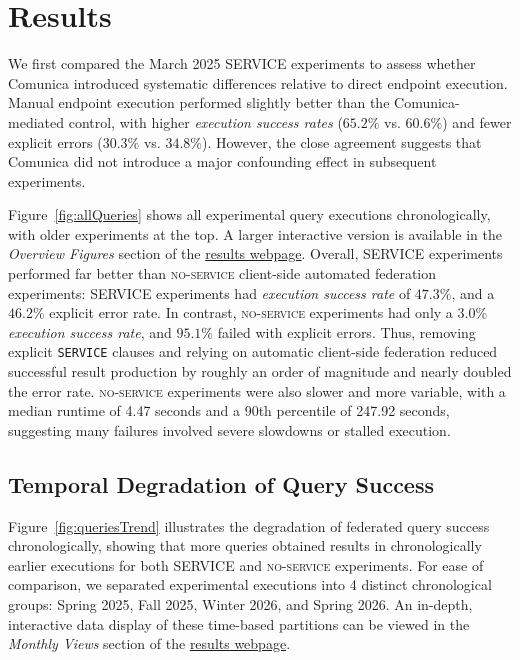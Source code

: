 \documentclass[runningheads]{llncs}
\begin{document}
\section{Results}\label{sec5}
We first compared the March 2025 \textsc{SERVICE} experiments to assess whether Comunica introduced systematic differences relative to direct endpoint execution.
Manual endpoint execution performed slightly better than the Comunica-mediated control, with higher \emph{execution success rates} (\(65.2\%\) vs. \(60.6\%\)) and fewer explicit errors (\(30.3\%\) vs. \(34.8\%\)).
However, the close agreement suggests that Comunica did not introduce a major confounding effect in subsequent experiments.


Figure~\ref{fig:allQueries} shows all experimental query executions chronologically, with older experiments at the top.
A larger interactive version is available in the \textit{Overview Figures} section of the \href{https://ecrum19.github.io/fed-survey-results/}{results webpage}.
Overall, \textsc{SERVICE} experiments performed far better than \textsc{no-service} client-side automated federation experiments: \textsc{SERVICE} experiments had \emph{execution success rate} of \(47.3\%\), and a \(46.2\%\) explicit error rate.
In contrast, \textsc{no-service} experiments had only a \(3.0\%\) \emph{execution success rate}, and \(95.1\%\) failed with explicit errors.
Thus, removing explicit \texttt{SERVICE} clauses and relying on automatic client-side federation reduced successful result production by roughly an order of magnitude and nearly doubled the error rate.
\textsc{no-service} experiments were also slower and more variable, with a median runtime of 4.47 seconds and a 90th percentile of 247.92 seconds, suggesting many failures involved severe slowdowns or stalled execution.


\subsection{Temporal Degradation of Query Success}\label{sec5.1}


Figure~\ref{fig:queriesTrend} illustrates the degradation of federated query success chronologically, showing that more queries obtained results in chronologically earlier executions for both \textsc{SERVICE} and \textsc{no-service} experiments.
For ease of comparison, we separated experimental executions into 4 distinct chronological groups: Spring 2025, Fall 2025, Winter 2026, and Spring 2026.
An in-depth, interactive data display of these time-based partitions can be viewed in the \textit{Monthly Views} section of the \href{https://ecrum19.github.io/fed-survey-results/}{results webpage}.
\end{document}
